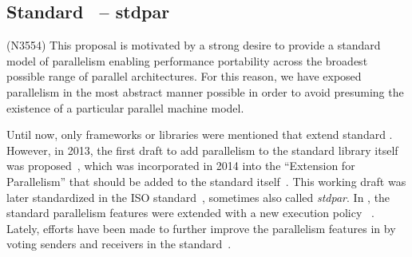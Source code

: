 \subsection{Standard \cpp\ -- stdpar}
\label{sec:frameworks:stdpar}

\begin{quotebox}{\citet{hoberock_parallel_2013} (N3554)}
    This proposal is motivated by a strong desire to provide a standard model of parallelism enabling performance portability across the broadest possible range of parallel architectures. For this reason, we have exposed parallelism in the most abstract manner possible in order to avoid presuming the existence of a particular parallel machine model.
\end{quotebox}

Until now, only frameworks or libraries were mentioned that extend standard \cpp. 
However, in 2013, the first draft to add parallelism to the \cpp standard library itself was proposed~\cite{hoberock_parallel_2013}, which was incorporated in 2014 into the \enquote{Extension for Parallelism} that should be added to the \cpp standard itself~\cite{hoberock_n3960_2014}. 
This working draft was later standardized in the ISO  standard~\cite{hoberock_p0024r2_2016, international_organization_for_standardization_isoiec_2017}, sometimes also called \textit{stdpar}. 
In , the \cpp standard parallelism features were extended with a new execution policy ~\cite{meredith_p1001r2_2019}. 
Lately, efforts have been made to further improve the parallelism features in \cpp by voting senders and receivers in the  standard~\cite{dominiak_p2300r10_2024, baker_p3396r0_2024, niebler_p3325r5_2024}. 

